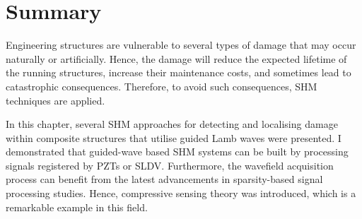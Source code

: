 \section{Summary}
\label{sec24}
Engineering structures are vulnerable to several types of damage that may occur naturally or artificially.
Hence, the damage will reduce the expected lifetime of the running structures, increase their maintenance costs, and sometimes lead to catast\-rophic consequences.
Therefore, to avoid such consequences, SHM techniques are applied.

In this chapter, several SHM approaches for detecting and localising damage within composite structures that utilise guided Lamb waves were presented.
I demonstrated that guided-wave based SHM systems can be built by processing signals registered by PZTs or SLDV.
Furthermore, the wavefield acquisition process can benefit from the latest advancements in sparsity-based signal processing studies.
Hence, compressive sensing theory was introduced, which is a remarkable example in this field.
